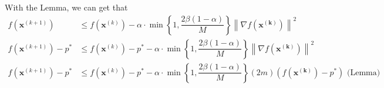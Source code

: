 With the Lemma, we can get that
\begin{align*}
    f\left(\mathbf{x}^{(k+1)}\right) &\leq f\left(\mathbf{x}^{(k)}\right) - \alpha\cdot\min\left\{1,\dfrac{2\beta(1-\alpha)}{M}\right\}\left\|\nabla f\left(\mathbf{x^{(k)}}\right)\right\|^2\\
    f\left(\mathbf{x}^{(k+1)}\right)-p^* &\leq f\left(\mathbf{x}^{(k)}\right) - p^* - \alpha\cdot\min\left\{1,\dfrac{2\beta(1-\alpha)}{M}\right\}\left\|\nabla f\left(\mathbf{x^{(k)}}\right)\right\|^2\\
    f\left(\mathbf{x}^{(k+1)}\right)-p^* &\leq f\left(\mathbf{x}^{(k)}\right) - p^* - \alpha\cdot\min\left\{1,\dfrac{2\beta(1-\alpha)}{M}\right\}(2m)\left(f\left(\mathbf{x^{(k)}}\right)-p^*\right) \text{\ \ \ \ \ \ (Lemma)} \\
\end{align*}








